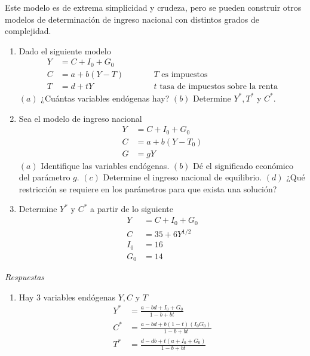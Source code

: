 Este modelo es de extrema simplicidad y crudeza, pero se pueden construir otros modelos de determinación de ingreso nacional con distintos grados de complejidad.

\begin{ejercicio}
    \begin{enumerate}
        \item Dado el siguiente modelo 
        $$
        \begin{aligned}
            Y &= C+I_0+G_0 \\
            C &=a+b(Y-T) \qquad &&T\text{ es impuestos} \\
            T &= d+tY \qquad &&t\text{ tasa de impuestos sobre la renta}
        \end{aligned}
        $$
        \((a)\) ¿Cuántas variables endógenas hay?
        \((b)\) Determine \(Y^\ast,T^\ast\) y \(C^\ast\).
        \item Sea el modelo de ingreso nacional 
        $$
        \begin{aligned}
            Y &= C+I_0+G_0 \\
            C &=a+b(Y-T_0)  \\
            G &= gY
        \end{aligned}
        $$
        \((a)\) Identifique las variables endógenas.
        \((b)\) Dé el significado económico del parámetro \(g\).
        \((c)\) Determine el ingreso nacional de equilibrio.
        \((d)\) ¿Qué restricción se requiere en los parámetros para que exista una solución?
        \item Determine \(Y^\ast\) y \(C^\ast\) a partir de lo siguiente
        $$
        \begin{aligned}
            Y &= C+I_0+G_0 \\
            C &=35+6Y^{1/2}  \\
            I_0 &= 16 \\
            G_0 & = 14
        \end{aligned}
        $$
    \end{enumerate}
    \emph{Respuestas}
    \begin{enumerate}
        \item Hay 3 variables endógenas \(Y,C\) y \(T\)
        $$
        \begin{aligned}
            Y^\ast &= \frac{a-bd+I_0+G_0}{1-b+bt} \\
            C^\ast &= \frac{a-bd+b(1-t)(I_0G_0)}{1-b+bt}  \\
            T^\ast &= \frac{d-db+t(a+I_0+G_0)}{1-b+bt}

\end{aligned}$$
\end{enumerate}
\end{ejercicio}
